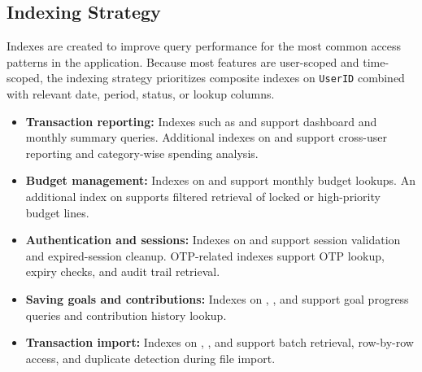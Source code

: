 ﻿\documentclass{article}
\begin{document}
\subsection{Indexing Strategy}

Indexes are created to improve query performance for the most common access patterns in the application. 
Because most features are user-scoped and time-scoped, the indexing strategy prioritizes composite 
indexes on \texttt{UserID} combined with relevant date, period, status, or lookup columns.

\begin{itemize}
    \item \textbf{Transaction reporting:} 
    Indexes such as  and 
     support dashboard and monthly summary queries. 
    Additional indexes on  and 
     support cross-user reporting and category-wise 
    spending analysis.

    \item \textbf{Budget management:} 
    Indexes on  and 
     support monthly budget lookups. 
    An additional index on  
    supports filtered retrieval of locked or high-priority budget lines.

    \item \textbf{Authentication and sessions:} 
    Indexes on  and 
     support session validation and expired-session cleanup. 
    OTP-related indexes support OTP lookup, expiry checks, and audit trail retrieval.

    \item \textbf{Saving goals and contributions:} 
    Indexes on , , 
    and  support goal progress queries and 
    contribution history lookup.

    \item \textbf{Transaction import:} 
    Indexes on , 
    , and 
     support batch retrieval, row-by-row access, 
    and duplicate detection during file import.
\end{itemize}
\end{document}
